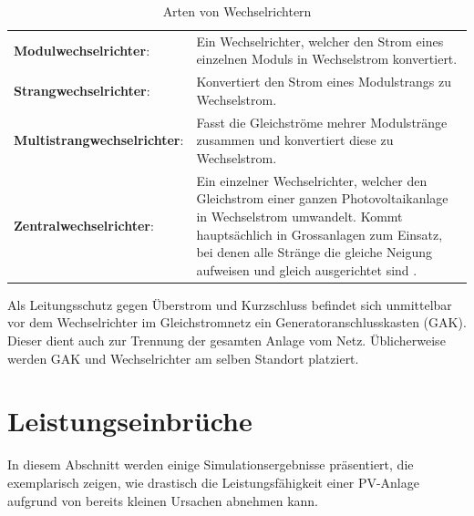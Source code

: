 \begin{table}[h!tb]
    \centering
    \caption{Arten von Wechselrichtern}
    \label{tab:inverters}
    \begin{tabular}{p{50mm}p{70mm}}
        \toprule
        \textbf{Modulwechselrichter}: &
        Ein  Wechselrichter,  welcher  den  Strom eines  einzelnen  Moduls  in
        Wechselstrom konvertiert. \\

        \textbf{Strangwechselrichter}: &
        Konvertiert den Strom eines Modulstrangs zu Wechselstrom. \\

        \textbf{Multistrangwechselrichter}: &
        Fasst   die   Gleichstr\"ome   mehrer  Modulstr\"ange   zusammen   und
        konvertiert diese zu Wechselstrom. \\

        \textbf{Zentralwechselrichter}: &
        Ein  einzelner Wechselrichter,  welcher den  Gleichstrom einer  ganzen
        Photovoltaikanlage in Wechselstrom umwandelt. Kommt haupts\"achlich in
        Grossanlagen zum Einsatz, bei denen alle Str\"ange die gleiche Neigung
        aufweisen und gleich ausgerichtet sind \cite{ref:pv:ratgeber}.\\
        \bottomrule
    \end{tabular}
\end{table}

Als Leitungsschutz gegen \"Uberstrom und Kurzschluss befindet sich unmittelbar
vor  dem   Wechselrichter  im  Gleichstromnetz   ein  Generatoranschlusskasten
(GAK). Dieser   dient   auch   zur    Trennung   der   gesamten   Anlage   vom
Netz. \"Ublicherweise  werden  GAK  und   Wechselrichter  am  selben  Standort
platziert.


\clearpage
\section{Leistungseinbr\"uche}
\label{sec:shadedCells}

In  diesem Abschnitt  werden einige  Simulationsergebnisse pr\"asentiert,  die
exemplarisch zeigen,  wie drastisch  die Leistungsf\"ahigkeit  einer PV-Anlage
aufgrund von bereits kleinen Ursachen abnehmen kann.

